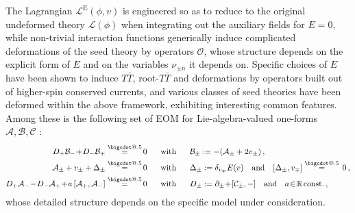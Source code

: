 \documentclass[12pt]{article}
\makeatletter
\newcommand*\bigcdot{\mathpalette\bigcdot@{.5}}
\newcommand*\bigcdot@[2]{\mathbin{\vcenter{\hbox{\scalebox{#2}{$\m@th#1\bullet$}}}}}
\newcommand{\deq}{\stackrel{\bigcdot}{=}}
\numberwithin{equation}{section}
\makeatother
\begin{document}
\noindent
The Lagrangian $\mathcal{L}^{\text{E}}(\phi,v)$ is engineered so as to reduce to the original undeformed theory $\mathcal{L}(\phi)$ when integrating out the auxiliary fields for $E=0$, while non-trivial interaction functions generically induce complicated deformations of the seed theory by operators $\mathcal{O}$, whose structure depends on the explicit form of $E$ and on the variables $\nu_{\pm n}$ it depends on. Specific choices of $E$ have been shown to induce $T\bar{T}$, root-$T\bar{T}$ and deformations by operators built out of higher-spin conserved currents, and various classes of seed theories have been deformed within the above framework, exhibiting interesting common features. Among these is the following set of EOM for Lie-algebra-valued one-forms $\mathcal{A},\mathcal{B},\mathcal{C}$ \cite{Bielli:2025uiv}:
\begin{align}
D_{+}\mathcal{B}_{-}\!+\!D_{-}\mathcal{B}_{+} \deq & \, 0 
\quad\,\,\,\, \text{with} \quad\,\,\,\,
\mathcal{B}_{\pm} := -(\mathcal{A}_{\pm}+2v_{\pm}) \, , \label{AF-general-EOM-for-identity}
\\
\mathcal{A}_{\pm}+v_{\pm}+\Delta_{\pm} \deq & \, 0 
\quad\,\,\,\, \text{with} \quad\,\,\,\, 
\Delta_{\pm}:= \delta_{v_{\mp}}E(v) 
\quad \text{and} \quad [\Delta_{\pm},v_{\mp}]\deq \, 0 \, , \notag
\\
D_{+}\mathcal{A}_{-} \!-\!D_{-}\mathcal{A}_{+} \!+\! a \,[\mathcal{A}_{+},\mathcal{A}_{-}] \deq & \, 0 
\quad\,\,\,\, \text{with} \quad\,\,\,\, 
 D_{\pm}:=\partial_{\pm}\!+\![\mathcal{C}_{\pm},-]
\quad \text{and} \quad a \! \in \! \mathbb{R} \, \text{const.} \, , \notag
\end{align}
whose detailed structure depends on the specific model under consideration.
\end{document}
